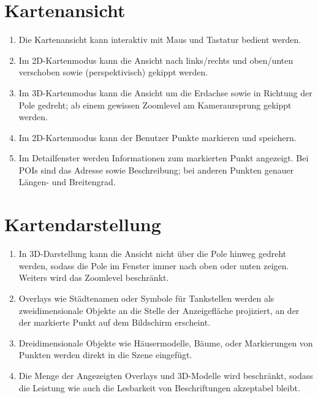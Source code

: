 \documentclass[10pt]{scrreprt}
\begin{document}
\section{Kartenansicht}
\begin{enumerate}[leftmargin=2.5cm,resume]
\item Die Kartenansicht kann interaktiv mit Maus und Tastatur bedient werden.
\item Im 2D-Kartenmodus kann die Ansicht nach links/rechts und oben/unten verschoben sowie (perspektivisch) gekippt werden. 
\item Im 3D-Kartenmodus kann die Ansicht um die Erdachse sowie in Richtung der Pole gedreht; ab einem gewissen Zoomlevel am Kameraursprung gekippt werden.
\wunsch
\item Im 2D-Kartenmodus kann der Benutzer Punkte markieren und speichern.
\muss
\item Im Detailfenster werden Informationen zum markierten Punkt angezeigt. Bei POIs sind das Adresse sowie Beschreibung; bei anderen Punkten genauer Längen- und Breitengrad.
\end{enumerate}

\section{Kartendarstellung}
\begin{enumerate}[leftmargin=2.5cm,resume]
\item In 3D-Darstellung kann die Ansicht nicht über die Pole hinweg gedreht werden, sodass die Pole im Fenster immer nach oben oder unten zeigen. Weiters wird das Zoomlevel beschränkt.
\item Overlays wie Städtenamen oder Symbole für Tankstellen werden als zweidimensionale Objekte an die Stelle der Anzeigefläche projiziert, an der der markierte Punkt auf dem Bildschirm erscheint.
\wunsch
\item Dreidimensionale Objekte wie Häusermodelle, Bäume, oder  Markierungen von Punkten werden direkt in die Szene eingefügt.
\muss
\item Die Menge der Angezeigten Overlays und 3D-Modelle wird beschränkt, sodass die Leistung wie auch die Lesbarkeit von Beschriftungen akzeptabel bleibt.
\end{enumerate}
\end{document}
